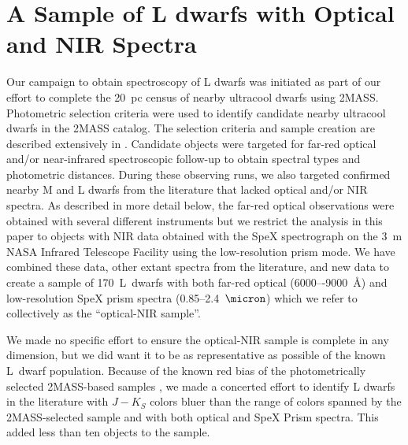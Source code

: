 \documentclass[12pt]{aastex6}
\newcommand{\sample}{170}
\begin{document}
\section{A Sample of L dwarfs with Optical and NIR Spectra}
\label{sec:sample}

Our campaign to obtain spectroscopy of L dwarfs was initiated as part of our effort to complete the 20~pc census of nearby ultracool dwarfs using 2MASS.
Photometric selection criteria were used to identify candidate nearby ultracool dwarfs in the 2MASS catalog.
The selection criteria and sample creation are described extensively in \citet[Papers~III, V, and IX]{Cruz03,Cruz07,Reid08}.
Candidate objects were targeted for far-red optical and/or near-infrared spectroscopic follow-up to obtain spectral types and photometric distances.
During these observing runs, we also targeted confirmed nearby M and L dwarfs from the literature that lacked optical and/or NIR spectra.
As described in more detail below, the far-red optical observations were obtained with several different instruments but we restrict the analysis in this paper to objects with NIR data obtained with the SpeX spectrograph \citep{Spex} on the 3~m NASA Infrared Telescope Facility using the low-resolution prism mode.
We have combined these data, other extant spectra from the literature, and new data to create a sample of \sample~L~dwarfs with both far-red optical (6000–-9000~\AA) and low-resolution SpeX prism spectra (0.85--2.4~$\micron$) which we refer to collectively as the ``optical-NIR sample''.

We made no specific effort to ensure the optical-NIR sample is complete in any dimension, but we did want it to be as representative as possible of the known L~dwarf population.
Because of the known red bias of the photometrically selected 2MASS-based samples \cite[Figure 3]{Schmidt10}, we made a concerted effort to identify L dwarfs in the literature with $J-K_S$ colors bluer than the range of colors spanned by the 2MASS-selected sample and with both optical and SpeX Prism spectra.
This added less than ten objects to the sample.
\end{document}
